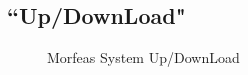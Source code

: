 \subsection{``Up/DownLoad"}

\begin{figure}[h]
\centering
	\caption{Morfeas System Up/DownLoad}
	\label{fig:sys_conf_up_down}
\end{figure}
